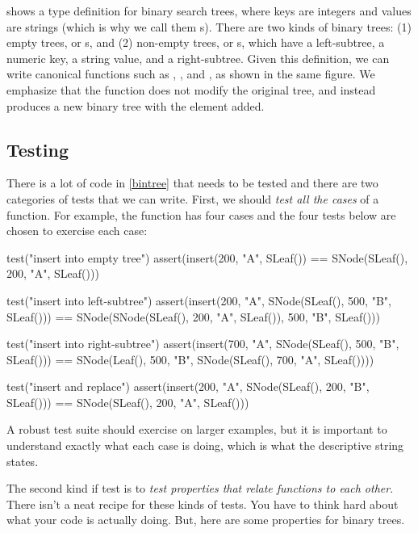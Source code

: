 \documentclass[9pt]{extbook}
\begin{document}
 shows a type definition for binary search trees, where
keys are integers and values are strings (which is why we call them
s). There are two
kinds of binary trees: (1) empty trees, or s, and (2)
non-empty trees, or s, which have a left-subtree,
a numeric key, a string value, and a right-subtree.
Given this definition, we can write canonical functions such
as , , and ,
as shown in the same figure.
We emphasize that the  function does not modify the
original tree, and instead produces a new binary tree with the element added.


\subsection{Testing}

There is a lot of code in \cref{bintree} that needs to be tested and there
are two categories of tests that we can write. First, we should \emph{test all the
cases} of a function. For example, the  function has
four cases and the four tests below are chosen to exercise each case:
\begin{scalacode}
test("insert into empty tree") {
  assert(insert(200, "A", SLeaf()) == SNode(SLeaf(), 200, "A", SLeaf()))
}

test("insert into left-subtree") {
  assert(insert(200, "A", SNode(SLeaf(), 500, "B", SLeaf()))
    == SNode(SNode(SLeaf(), 200, "A", SLeaf()), 500, "B", SLeaf()))
}

test("insert into right-subtree") {
  assert(insert(700, "A", SNode(SLeaf(), 500, "B", SLeaf()))
    == SNode(Leaf(), 500, "B", SNode(SLeaf(), 700, "A", SLeaf())))
}

test("insert and replace") {
  assert(insert(200, "A", SNode(SLeaf(), 200, "B", SLeaf()))
    == SNode(SLeaf(), 200, "A", SLeaf()))
}
\end{scalacode}

A robust test suite should exercise  on larger examples, but
it is important to understand exactly what each case is doing, which is what the
descriptive string states.

The second kind if test is to \emph{test properties that relate functions
to each other}. There isn't a neat recipe for these kinds of tests. You have
to think hard about what your code is actually doing. But, here
are some properties for binary trees.
\end{document}
